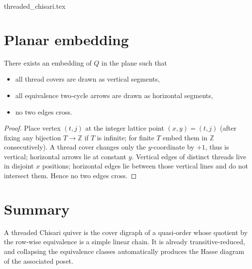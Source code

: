 \begin{filecontents*}{threaded_chisari.tex}
    \section{Planar embedding}
    
    \begin{proposition}\label{prop:planar}
    There exists an embedding of $Q$ in the plane such that
    \begin{itemize}
      \item all thread covers are drawn as vertical segments,
      \item all equivalence two‑cycle arrows are drawn as horizontal segments,
      \item no two edges cross.
    \end{itemize}
    \end{proposition}
    
    \begin{proof}
    Place vertex $(t,j)$ at the integer lattice point $(x,y)=(t,j)$
    (after fixing any bijection $T\to\mathbb Z$ if $T$ is infinite;
    for finite $T$ embed them in $\mathbb Z$ consecutively).
    A thread cover changes only the $y$‑coordinate by $+1$, thus is vertical;  
    horizontal arrows lie at constant $y$.
    Vertical edges of distinct threads live in disjoint $x$ positions; 
    horizontal edges lie between those vertical lines and do not intersect them.
    Hence no two edges cross.
    \end{proof}
    
    \section*{Summary}
    A threaded Chisari quiver is the cover digraph of a quasi‑order whose
    quotient by the row‑wise equivalence is a simple linear chain.
    It is already transitive‑reduced, and collapsing the equivalence classes
    automatically produces the Hasse diagram of the associated poset.
    
    \end{filecontents*}
    
